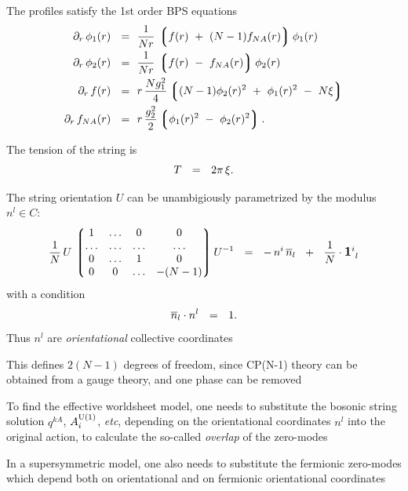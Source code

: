 \documentclass[12pt,letterpaper,landscape,KOMA,smallheadings,calcdimensions,display]{powersem}
\begin{document}
\begin{slide}
	The profiles satisfy the 1st order BPS equations 
\begin{align*}
%
	\p_r\, \phi_1(r) ~~=~~ & \frac{1}{Nr}\, \lgr f(r) ~+~ (N-1)f_{NA}(r) \rgr \phi_1(r)  \\
%
	\p_r\, \phi_2(r) ~~=~~ & \frac{1}{Nr}\, \lgr f(r) ~-~ f_{NA}(r) \rgr \phi_2(r) \\
%
	\p_r\, f(r)      ~~=~~ & r\, \frac{N g_1^2}{4} \lgr (N-1)\phi_2(r)^2 ~+~ \phi_1(r)^2 ~-~ N\xi \rgr \\
	\p_r\, f_{NA}(r)  ~~=~~ & r\, \frac{g_2^2}{2} \lgr \phi_1(r)^2 ~-~ \phi_2(r)^2 \rgr 
	\text.
\end{align*}

	The tension of the string is 
\[
	T  ~~=~~ 2\pi\, \xi \text.
\]

\end{slide}

\begin{slide}
	The string orientation $ U $ can be unambigiously parametrized by the modulus $ n^l \in C $:
\[
	\frac{1}{N}\, U \, \lgr \begin{matrix}
				  1  & \ldots & 0 & 0 \\
				  \ldots & \ldots & \ldots & \ldots \\
				  0 & \ldots & 1 & 0  \\
				  0 & 0 & \ldots & -(N-1) 
				\end{matrix} \rgr
			U^{-1}  
	~~=~~
	-\, n^i\,\ov{n}{}_l  ~~+~~ \frac{1}{N}\cdot{\mathlarger{\mathbf{1}}}{}^i_{~l} 
\]
	with a condition
\[
	\overline{n}{}_l \cdot n^l ~~=~~ 1 \text.
\]
	Thus $ n^l $ are \emph{orientational} collective coordinates

	This defines $ 2(N - 1) $ degrees of freedom, since CP(N-1) theory can be obtained from a gauge
	theory, and one phase can be removed

\end{slide}


\begin{slide}
\vspace*{\fill}
	To find the effective worldsheet model, one needs to substitute the bosonic string solution  $ q^{kA} $,
	$ A_i^{\rm U(1)} $, {\it etc}, 
	depending on the orientational coordinates $ n^l $ into the original action, to calculate
	the so-called \emph{overlap} of the zero-modes

	In a supersymmetric model, one also needs to substitute the fermionic zero-modes which depend
	both on orientational and on fermionic orientational coordinates
\vspace*{\fill}
\end{slide}
\end{document}

